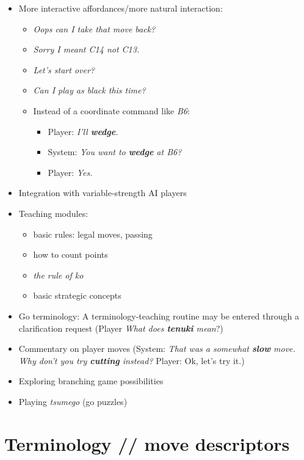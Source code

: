 \documentclass{scrartcl}
\begin{document}
\begin{itemize}
\item
  More interactive affordances/more natural interaction:

  \begin{itemize}
  \item
    \emph{Oops can I take that move back?}
  \item
    \emph{Sorry I meant \emph{C14} not \emph{C13}.}
  \item
    \emph{Let's start over?}
  \item
    \emph{Can I play as black this time?}
  \item
    Instead of a coordinate command like \emph{B6}:

    \begin{itemize}
    \item
      Player: \emph{I'll \textbf{wedge}.}
    \item
      System: \emph{You want to \textbf{wedge} at \emph{B6}?}
    \item
      Player: \emph{Yes.}
    \end{itemize}
  \end{itemize}
\item
  Integration with variable-strength AI players
\item
  Teaching modules:

  \begin{itemize}
  \item
    basic rules: legal moves, passing
  \item
    how to count points
  \item
    \emph{the rule of ko}
  \item
    basic strategic concepts
  \end{itemize}
\item
  Go terminology: A terminology-teaching routine may be entered through
  a clarification request (Player \emph{What does \textbf{tenuki}
  mean}?)
\item
  Commentary on player moves (System: \emph{That was a somewhat
  \textbf{slow} move. Why don't you try \textbf{cutting} instead?}
  Player: Ok, let's try it.)
\item
  Exploring branching game possibilities
\item
  Playing \emph{tsumego} (go puzzles)
\end{itemize}

\section{Terminology // move descriptors}
\end{document}
